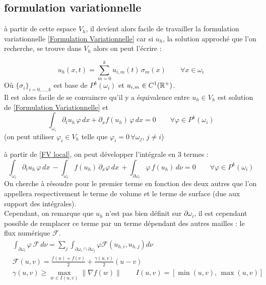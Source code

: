 \documentclass[11pt]{article}%
\begin{document}
\subsection{formulation variationnelle}
à partir de cette espace $V_h$, il devient alors facile de travailler la formulation variationnelle \eqref{Formulation Variationnelle} car si $u_h$, la solution approché que l'on recherche, se trouve dans $V_h$ alors on peut l'écrire : 

\begin{equation}
    u_h(x,t) = \sum_{m=0}^k u_{i,m}(t)\,\sigma_m(x)\qquad \forall x \in \omega_i
\end{equation}
Où $\{\sigma_i\}_{i=0,\dots,k}$ est base de $P^k(\omega_i)$ et $u_{i,m} \in C^1(\mathbb{R}^+ )$.\\
Il est alors facile de se convaincre qu'il y a équivalence entre $u_h \in V_h$ est solution de \eqref{Formulation Variationnelle} et 
\begin{equation}\label{FV local}
    \int_{\omega_i} \partial_tu_h \,\varphi \, dx + \partial_xf(u_h) \, \varphi \,dx =0 \qquad \forall \varphi \in P^k(\omega_i)
\end{equation}
(on peut utiliser $\varphi_i \in V_h$ telle que $\varphi_i =0 \, \forall \omega_j$, $j\neq i$)

à partir de \eqref{FV local}, on peut développer l'intégrale en $3$ termes : 
\begin{equation}
    \int_{\omega_i} \partial_tu_h \,\varphi \, dx \,- \int_{\omega_i} f(u_h) \,\partial_x \varphi \,dx \, + 
    \int_{\partial \omega_i} \varphi \,f(u_h)   \, d\nu 
    =0  \qquad \forall \varphi \in P^k(\omega_i)
\end{equation}
On cherche à résoudre pour le premier terme en fonction des deux autres que l'on appellera respectivement le terme de volume et le terme de surface (due aux support des intégrales). \\
Cependant, on remarque que $u_h$ n'est pas bien définit sur $\partial\omega_i$, il est cependant possible de remplacer ce terme par un terme dépendant des autres mailles : le flux numérique $\mathcal{F}$.
\begin{align}
    &\int_{\partial \omega_i} \varphi \, \mathcal{F}  \, d\nu = \sum_j \int_{\partial\omega_i \cap \partial\omega_j} \varphi \mathcal{F}(u_{h,i},u_{h,j}) d\nu\\
    &\mathcal{F}(u,v) = \frac{f(u)+f(v)}{2} + \frac{\gamma(u,v)}{2}(u-v)\\
    &\gamma(u,v) \geq \max_{w\in I(u,v)} \|\nabla f(w) \| \qquad I(u,v) = [\min(u,v), \, \max(u,v)] \label{local LF} 
\end{align}
\end{document}
